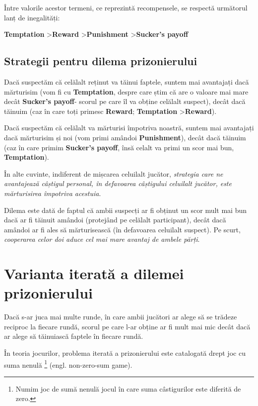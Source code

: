 Între valorile acestor termeni, ce reprezintă recompensele, se respectă următorul lanț de inegalități: 

\begin{center} 
	\textbf{Temptation} \textgreater \textbf{Reward} \textgreater \textbf{Punishment} \textgreater \textbf{Sucker's payoff} 
\end{center} 

\subsection{Strategii pentru dilema prizonierului}

Dacă suspectăm că celălalt reținut va tăinui faptele, suntem mai avantajați dacă mărturisim (vom fi  cu \textbf{Temptation}, despre care știm că are o valoare mai mare decât \textbf{Sucker's payoff}- scorul pe care îl va obține celălalt suspect), decât dacă tăinuim (caz în care toți primesc \textbf{Reward}; \textbf{Temptation} \textgreater \textbf{Reward}).

Dacă suspectăm că celălalt va mărturisi împotriva noastră, suntem mai avantajați dacă mărturisim și noi (vom primi amândoi \textbf{Punishment}), decât dacă tăinuim (caz în care primim \textbf{Sucker's payoff}, însă celalt va primi un scor mai bun, \textbf{Temptation}).

În alte cuvinte, indiferent de mișcarea celuilalt jucător, \textit{strategia care ne avantajează câștigul personal, în defavoarea câștigului celuilalt jucător, este mărturisirea împotriva acestuia}.

Dilema este dată de faptul că ambii suspecți ar fi obținut un scor mult mai bun dacă ar fi tăinuit amândoi (protejând pe celălalt participant), decât dacă amândoi ar fi ales să mărturisească (în defavoarea celuilalt suspect). Pe scurt, \textit{cooperarea celor doi aduce cel mai mare avantaj de ambele părți}.

\section {Varianta iterată a dilemei prizonierului} 

Dacă s-ar juca mai multe runde, în care ambii jucători ar alege să se trădeze reciproc la fiecare rundă, scorul pe care l-ar obține ar fi mult mai mic decât dacă ar alege să tăinuiască faptele în fiecare rundă. 

În teoria jocurilor, problema iterată a prizonierului este catalogată drept joc cu suma nenulă \footnote{Numim joc de sumă nenulă jocul în care suma câstigurilor este diferită de zero.} (engl. non-zero-sum game).

